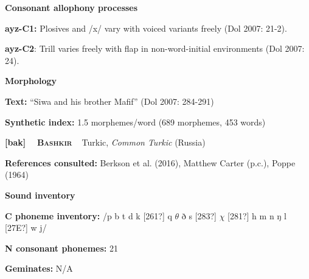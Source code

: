 \begin{styleBody}
\textbf{Consonant allophony processes}
\end{styleBody}

\begin{styleBody}
\textbf{ayz-C1:} Plosives and /x/ vary with voiced variants freely (Dol 2007: 21-2).
\end{styleBody}

\begin{styleBody}
\textbf{ayz-C2}: Trill varies freely with flap in non-word-initial environments (Dol 2007: 24).
\end{styleBody}

\begin{styleBody}
\textbf{Morphology}
\end{styleBody}

\begin{styleBody}
\textbf{Text:} “Siwa and his brother Mafif” (Dol 2007: 284-291)
\end{styleBody}

\begin{styleBody}
\textbf{Synthetic index: }1.5 morphemes/word (689 morphemes, 453 words)
\end{styleBody}

\clearpage\begin{styleBody}
\textbf{[bak] }\ \ \textbf{\textsc{Bashkir}}\textbf{\ \ }Turkic, \textit{Common Turkic} (Russia)
\end{styleBody}

\begin{styleBody}
\textbf{References consulted: }Berkson et al. (2016), Matthew Carter (p.c.), Poppe (1964)
\end{styleBody}

\begin{styleBody}
\textbf{Sound inventory}
\end{styleBody}

\begin{styleBody}
\textbf{C phoneme inventory:} /p b t d k [261?] q $\theta $ ð s [283?] $\chi $ [281?] h m n ŋ l [27E?] w j/
\end{styleBody}

\begin{styleBody}
\textbf{N consonant phonemes:} 21
\end{styleBody}

\begin{styleBody}
\textbf{Geminates:} N/A
\end{styleBody}

